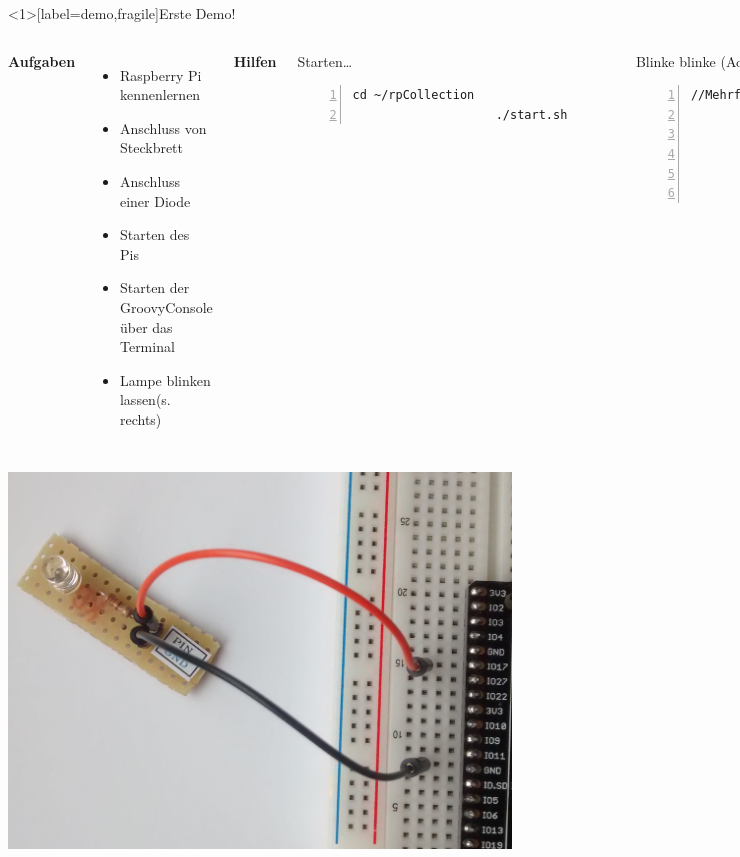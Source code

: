 \documentclass[usenames,dvipsnames]{beamer}
\begin{document}
\begin{frame}<1>[label=demo,fragile]{Erste Demo!}
	\begin{columns}[t]
			\textbf{Aufgaben}
			\begin{itemize}
				\item Raspberry Pi kennenlernen
				\item Anschluss von Steckbrett
				\item Anschluss einer Diode
				\item Starten des Pis
				\item Starten der GroovyConsole über das Terminal
				\item Lampe blinken lassen\newline (s. rechts)
			\end{itemize}

			\textbf{Hilfen}
			\begin{block}{Starten\ldots}
				\lstset{language=Bash}
				\begin{lstlisting}[numbers=left, stepnumber=1, numberstyle =\tiny\color{black!30}, gobble=10]
					cd ~/rpCollection
					./start.sh
				\end{lstlisting}
			\end{block}

			\begin{block}{Blinke blinke (Achtung Pin!)}
				\lstset{language=Java}
				\begin{lstlisting}[numbers=left, stepnumber=1, numberstyle =\tiny\color{black!30}, gobble=10]
					//Mehrfachausfuehrung:
					Helfer.herunterfahren()

					meinLicht = new RPDiode()
					meinLicht.setPin(11)
					meinLicht.blinke()
				\end{lstlisting}
			\end{block}
	\end{columns}
\end{frame}


\begin{frame}[plain]
	\includegraphics[width=\textwidth]{img/anschluss_diode_an_pin_17}
\end{frame}
\end{document}

